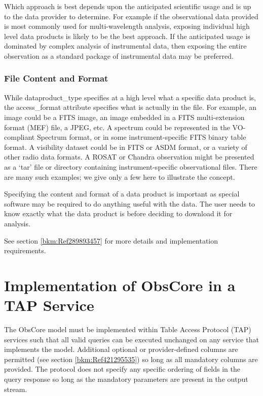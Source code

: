 \documentclass[11pt,a4paper]{ivoa}
\begin{document}
Which approach is best depends upon the anticipated scientific usage and is up to the data provider to determine.  For
example if the observational data provided is most commonly used for multi-wavelength analysis, exposing individual
high level data products is likely to be the best approach.  If the anticipated usage is dominated by complex analysis
of instrumental data, then exposing the entire observation as a standard package of instrumental data may be preferred.

\subsubsection{File Content and Format}
While dataproduct\_type specifies at a high level what a specific data product is, the access\_format attribute
specifies what is actually in the file.  For example, an {\textquotedbl}image{\textquotedbl} could be a FITS image, an
image embedded in a FITS multi-extension format (MEF) file, a JPEG, etc.  A {\textquotedbl}spectrum{\textquotedbl}
could be represented in the VO-compliant Spectrum format, or in some instrument-specific FITS binary table format.  A
visibility dataset could be in FITS or ASDM format, or a variety of other radio data formats.  A ROSAT or Chandra
observation might be presented as a `tar' file or directory containing instrument-specific observational files.  There
are many such examples; we give only a few here to illustrate the concept.

Specifying the content and format of a data product is important as special software may be required to do anything
useful with the data.  The user needs to know exactly what the data product is before deciding to download it for
analysis. 

See section \ref{bkm:Ref289893457} for more details and implementation requirements.

\section{Implementation of ObsCore in a TAP Service}
\label{sec:obstap-impl}The ObsCore model must be implemented within Table Access Protocol (TAP) services such that all
valid queries can be executed unchanged on any service that implements the model.  Additional optional or
provider-defined columns are permitted (see section \ref{bkm:Ref421295535}) so long as all mandatory columns are
provided.  The protocol does not specify any specific ordering of fields in the query response so long as the mandatory
parameters are present in the output stream.
\end{document}
